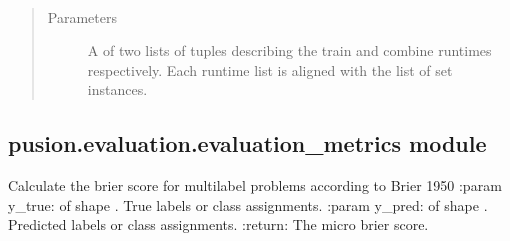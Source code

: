\documentclass[letterpaper,10pt,english]{sphinxmanual}
\begin{document}
\begin{fulllineitems}

\begin{fulllineitems}
\label{\detokenize{pusion.evaluation.evaluation:pusion.evaluation.evaluation.Evaluation.set_runtimes}}~\begin{quote}\begin{description}
\item[{Parameters}] \leavevmode
\sphinxAtStartPar
{} \textendash{} A  of two lists of tuples describing the train and combine runtimes respectively.
Each runtime list is aligned with the list of set instances.

\end{description}\end{quote}

\end{fulllineitems}


\end{fulllineitems}



\subsection{pusion.evaluation.evaluation\_metrics module}
\label{\detokenize{pusion.evaluation.evaluation_metrics:module-pusion.evaluation.evaluation_metrics}}\label{\detokenize{pusion.evaluation.evaluation_metrics:pusion-evaluation-evaluation-metrics-module}}\label{\detokenize{pusion.evaluation.evaluation_metrics::doc}}

\begin{fulllineitems}
\label{\detokenize{pusion.evaluation.evaluation_metrics:pusion.evaluation.evaluation_metrics.multi_label_brier_score_micro}}
\sphinxAtStartPar
Calculate the brier score for multi\sphinxhyphen{}label problems according to Brier 1950
:param y\_true:  of shape . True labels or class assignments.
:param y\_pred:  of shape . Predicted labels or class assignments.
:return: The micro brier score.

\end{fulllineitems}
\end{document}
